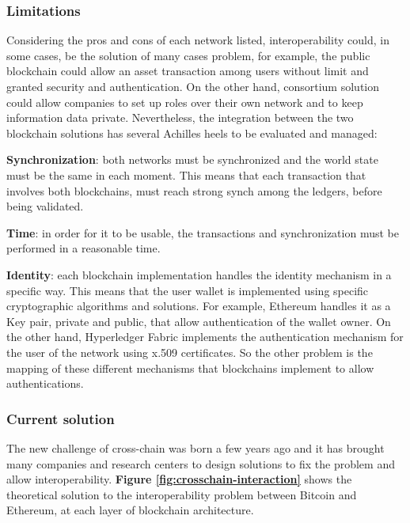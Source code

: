 \subsubsection{Limitations}

Considering the pros and cons of each network listed, interoperability could, in some cases, be the 
solution of many cases problem, for example, the public blockchain could allow an asset transaction among 
users without limit and granted security and authentication. On the other hand, consortium solution could 
allow companies to set up roles over their own network and to keep information data private. Nevertheless, 
the integration between the two blockchain solutions has several Achilles heels to be evaluated and managed:


\begin{outline}
    \1 \textbf{Synchronization}: both networks must be synchronized and the world state must be the same in 
    each moment. This means that each transaction that involves both blockchains, must reach strong synch among 
    the ledgers, before being validated. 

    \1 \textbf{Time}: in order for it to be usable, the transactions and synchronization
    must be performed in a reasonable time.
    
    \1 \textbf{Identity}: each blockchain implementation handles the identity mechanism in a specific way. 
    This means that the user wallet is implemented using specific cryptographic algorithms and solutions. For 
    example, Ethereum handles it as a Key pair, private and public, that allow authentication of the wallet 
    owner. On the other hand, Hyperledger Fabric implements the authentication mechanism for the user of the 
    network using x.509 certificates. So the other problem is the mapping of these different mechanisms that 
    blockchains implement to allow authentications. 
\end{outline}


\subsubsection{Current solution}

The new challenge of cross-chain was born a few years ago and it has brought many companies and research centers 
to design solutions to fix the problem and allow interoperability. \textbf{Figure \ref{fig:crosschain-interaction}} 
shows the theoretical solution to the interoperability problem between Bitcoin and Ethereum, at each layer of 
blockchain architecture\cite{crosschain-level}.

